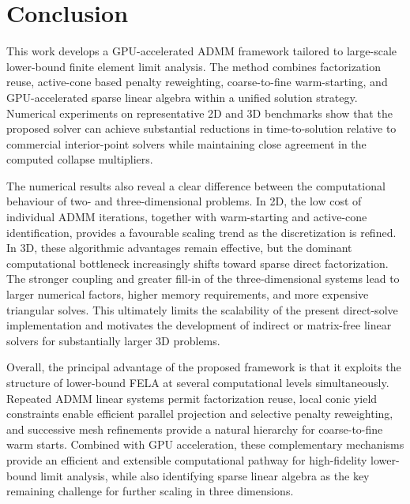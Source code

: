 
\section{Conclusion}

This work develops a GPU-accelerated ADMM framework tailored to large-scale lower-bound finite element limit analysis. The method combines factorization reuse, active-cone based penalty reweighting, coarse-to-fine warm-starting, and GPU-accelerated sparse linear algebra within a unified solution strategy. Numerical experiments on representative 2D and 3D benchmarks show that the proposed solver can achieve substantial reductions in time-to-solution relative to commercial interior-point solvers while maintaining close agreement in the computed collapse multipliers. 

The numerical results also reveal a clear difference between the computational behaviour of two- and three-dimensional problems. In 2D, the low cost of individual ADMM iterations, together with warm-starting and active-cone identification, provides a favourable scaling trend as the discretization is refined. In 3D, these algorithmic advantages remain effective, but the dominant computational bottleneck increasingly shifts toward sparse direct factorization. The stronger coupling and greater fill-in of the three-dimensional systems lead to larger numerical factors, higher memory requirements, and more expensive triangular solves. This ultimately limits the scalability of the present direct-solve implementation and motivates the development of indirect or matrix-free linear solvers for substantially larger 3D problems.


Overall, the principal advantage of the proposed framework is that it exploits the structure of lower-bound FELA at several computational levels simultaneously. Repeated ADMM linear systems permit factorization reuse, local conic yield constraints enable efficient parallel projection and selective penalty reweighting, and successive mesh refinements provide a natural hierarchy for coarse-to-fine warm starts. Combined with GPU acceleration, these complementary mechanisms provide an efficient and extensible computational pathway for high-fidelity lower-bound limit analysis, while also identifying sparse linear algebra as the key remaining challenge for further scaling in three dimensions.